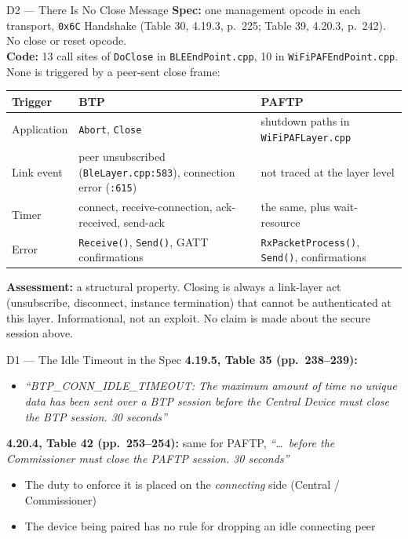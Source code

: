 \documentclass[10pt,aspectratio=169,t]{beamer}
\newcommand{\spec}[1]{\textcolor{blue!50!black}{\small\itshape #1}}
\begin{document}
\begin{frame}{D2 --- There Is No Close Message}
\small
\textbf{Spec:} one management opcode in each transport, \texttt{0x6C} Handshake
(Table 30, 4.19.3, p.~225; Table 39, 4.20.3, p.~242). No close or reset opcode.\\[4pt]
\textbf{Code:} 13 call sites of \texttt{DoClose} in \texttt{BLEEndPoint.cpp}, 10 in
\texttt{WiFiPAFEndPoint.cpp}. None is triggered by a peer-sent close frame:
\begin{center}
\footnotesize
\begin{tabular}{p{}p{}p{}}
\toprule
\textbf{Trigger} & \textbf{BTP} & \textbf{PAFTP} \\
\midrule
Application & \texttt{Abort}, \texttt{Close} & shutdown paths in \texttt{WiFiPAFLayer.cpp} \\
Link event & peer unsubscribed (\texttt{BleLayer.cpp:583}), connection error (\texttt{:615}) & not traced at the layer level \\
Timer & connect, receive-connection, ack-received, send-ack & the same, plus wait-resource \\
Error & \texttt{Receive()}, \texttt{Send()}, GATT confirmations & \texttt{RxPacketProcess()}, \texttt{Send()}, confirmations \\
\bottomrule
\end{tabular}
\end{center}
\textbf{Assessment:} a structural property. Closing is always a link-layer act
(unsubscribe, disconnect, instance termination) that cannot be authenticated at
this layer. Informational, not an exploit. No claim is made about the secure
session above.
\end{frame}

\begin{frame}{D1 --- The Idle Timeout in the Spec}
\small
\textbf{4.19.5, Table 35 (pp.~238--239):}
\begin{itemize}
  \item \spec{``BTP\_CONN\_IDLE\_TIMEOUT: The maximum amount of time no unique
        data has been sent over a BTP session before the Central Device must
        close the BTP session. 30 seconds''}
\end{itemize}
\textbf{4.20.4, Table 42 (pp.~253--254):} same for PAFTP, \spec{``\ldots\ before
the Commissioner must close the PAFTP session. 30 seconds''}
\vspace{4pt}
\begin{itemize}
  \item The duty to enforce it is placed on the \emph{connecting} side (Central
        / Commissioner)
  \item The device being paired has no rule for dropping an idle connecting peer
\end{itemize}
\end{frame}
\end{document}
